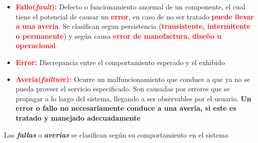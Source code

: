 \begin{itemize}
    \item \textcolor{red}{\textbf{Fallo(\textit{fault}):}} Defecto o funcionamiento anormal de un componente, el cual tiene el potencial de causar un \textcolor{red}{\textbf{error}}, en caso de no ser tratado \textcolor{red}{\textbf{puede llevar a una averia}}. Se clasifican segun persistencia (\textcolor{red}{\textbf{transistente, intermitente o permanente}}) y según causa \textcolor{red}{\textbf{error de manofactura, diseño u operacional}} 
    \item \textcolor{red}{\textbf{Error:}} Discrepancia entre el comportamiento esperado y el exhibido
    \item \textcolor{red}{\textbf{Averia(\textit{failture}):}} Ocurre un malfuncionamiento que conduce a que ya no se pueda proveer el servicio especificado. Son causadas por errores que se propagar a lo largo del sistema, llegando a ser observables por el usuario.
    \subitem \textbf{Un error o fallo no necesariamente conduce a una averia, si este es tratado y manejado adecuadamente}
\end{itemize}

Las \textbf{\textit{fallas}} o \textbf{\textit{averias}} se clasifican según su comportamiento en el sistema

